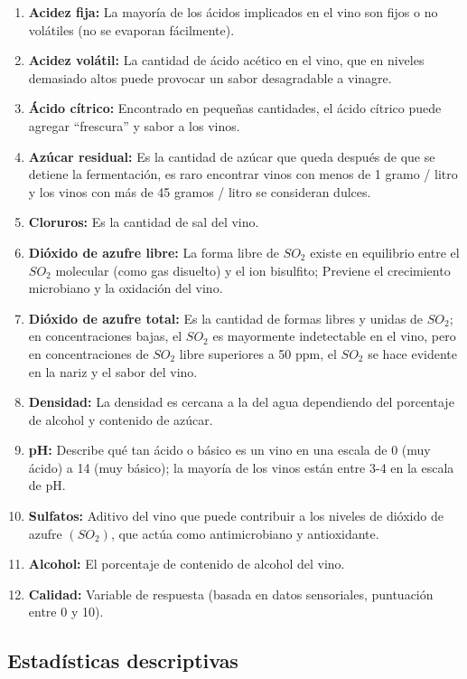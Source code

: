 \documentclass[
]{article}
\begin{document}
\begin{enumerate}
\def\labelenumi{\arabic{enumi}.}
\item
  \textbf{Acidez fija:} La mayoría de los ácidos implicados en el vino
  son fijos o no volátiles (no se evaporan fácilmente).
\item
  \textbf{Acidez volátil:} La cantidad de ácido acético en el vino, que
  en niveles demasiado altos puede provocar un sabor desagradable a
  vinagre.
\item
  \textbf{Ácido cítrico:} Encontrado en pequeñas cantidades, el ácido
  cítrico puede agregar ``frescura'' y sabor a los vinos.
\item
  \textbf{Azúcar residual:} Es la cantidad de azúcar que queda después
  de que se detiene la fermentación, es raro encontrar vinos con menos
  de 1 gramo / litro y los vinos con más de 45 gramos / litro se
  consideran dulces.
\item
  \textbf{Cloruros:} Es la cantidad de sal del vino.
\item
  \textbf{Dióxido de azufre libre:} La forma libre de \(SO_{2}\) existe
  en equilibrio entre el \(SO_{2}\) molecular (como gas disuelto) y el
  ion bisulfito; Previene el crecimiento microbiano y la oxidación del
  vino.
\item
  \textbf{Dióxido de azufre total:} Es la cantidad de formas libres y
  unidas de \(SO_{2}\); en concentraciones bajas, el \(SO_{2}\) es
  mayormente indetectable en el vino, pero en concentraciones de
  \(SO_{2}\) libre superiores a 50 ppm, el \(SO_{2}\) se hace evidente
  en la nariz y el sabor del vino.
\item
  \textbf{Densidad:} La densidad es cercana a la del agua dependiendo
  del porcentaje de alcohol y contenido de azúcar.
\item
  \textbf{pH:} Describe qué tan ácido o básico es un vino en una escala
  de 0 (muy ácido) a 14 (muy básico); la mayoría de los vinos están
  entre 3-4 en la escala de pH.
\item
  \textbf{Sulfatos:} Aditivo del vino que puede contribuir a los niveles
  de dióxido de azufre \((SO_{2})\), que actúa como antimicrobiano y
  antioxidante.
\item
  \textbf{Alcohol:} El porcentaje de contenido de alcohol del vino.
\item
  \textbf{Calidad:} Variable de respuesta (basada en datos sensoriales,
  puntuación entre 0 y 10).
\end{enumerate}

\hypertarget{estaduxedsticas-descriptivas}{%
\subsection{Estadísticas
descriptivas}\label{estaduxedsticas-descriptivas}}
\end{document}
